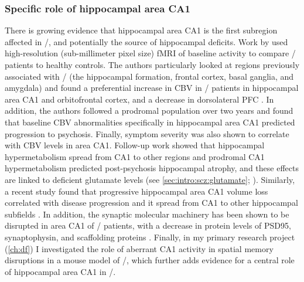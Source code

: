 \subsubsection{Specific role of hippocampal area CA1}
There is growing evidence that hippocampal area CA1 is the first subregion affected in \scz/, and potentially the source of hippocampal deficits.
Work by \citeauthor{Schobel2009} used high-resolution (sub-millimeter pixel size) \ac{fMRI} of baseline activity to compare \scz/ patients to healthy controls.
The authors particularly looked at regions previously associated with \scz/ (the hippocampal formation, frontal cortex, basal ganglia, and amygdala) and found a preferential increase in \ac{CBV} in \scz/ patients in hippocampal area CA1 and orbitofrontal cortex, and a decrease in dorsolateral \ac{PFC} \citep{Schobel2009}.
In addition, the authors followed a prodromal population over two years and found that baseline \ac{CBV} abnormalities specifically in hippocampal area CA1 predicted progression to psychosis.
Finally, symptom severity was also shown to correlate with \ac{CBV} levels in area CA1.
Follow-up work showed that hippocampal hypermetabolism spread from CA1 to other regions and prodromal CA1 hypermetabolism predicted post-psychosis hippocampal atrophy, and these effects are linked to deficient glutamate levels (see \autoref{sec:intro:scz:glutamate}; \citealp{Schobel2013}).
Similarly, a recent study found that progressive hippocampal area CA1 volume loss correlated with disease progression and it spread from CA1 to other hippocampal subfields \citep{Ho2017}.
In addition, the synaptic molecular machinery has been shown to be disrupted in area CA1 of \scz/ patients, with a decrease in protein levels of PSD95, synaptophysin, and scaffolding proteins \citep{Matosin2016}. 
Finally, in my primary research project (\autoref{ch:df}) I investigated the role of aberrant CA1 activity in spatial memory disruptions in a mouse model of \scz/, which further adds evidence for a central role of hippocampal area CA1 in \scz/.

